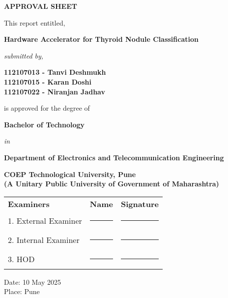 \thispagestyle{empty}

\cleardoublepage 
\vspace*{1cm}  
{}
\begin{center}
    \textbf{\Large APPROVAL SHEET}
    \vspace{1.5\baselineskip}

    \large This report entitled,
    \vspace{\baselineskip}

    \textbf{\Large Hardware Accelerator for Thyroid Nodule
Classification}
    \vspace{\baselineskip}

    \textit{submitted by,} 
    \vspace{\baselineskip}

    \textbf{112107013 - Tanvi Deshmukh} \\
    \textbf{112107015 - Karan Doshi} \\
    \textbf{112107022 - Niranjan Jadhav}
    \vspace{\baselineskip}

    is approved for the degree of
    \vspace{\baselineskip}

    \textbf{Bachelor of Technology} \par
    \vspace{0.5\baselineskip}
    \textit{in} \par
    \vspace{0.5\baselineskip}
    \textbf{Department of Electronics and Telecommunication Engineering}
    \vspace{\baselineskip}

    \textbf{COEP Technological University, Pune} \\
    \textbf{(A Unitary Public University of Government of Maharashtra)}
\end{center}

\vspace{2\baselineskip}

\begin{center}
\large
\begin{tabular}{lll}
\textbf{Examiners} & \textbf{Name} & \textbf{Signature} \\[1em]
1. External Examiner & \rule{5cm}{0.4pt} & \rule{4cm}{0.4pt} \\[1em]
2. Internal Examiner & \rule{5cm}{0.4pt} & \rule{4cm}{0.4pt} \\[1em]
3. HOD & \rule{5cm}{0.4pt} & \rule{4cm}{0.4pt} \\
\end{tabular}
\end{center}

\vspace{2\baselineskip}

Date: 10 May 2025\\
Place: Pune


